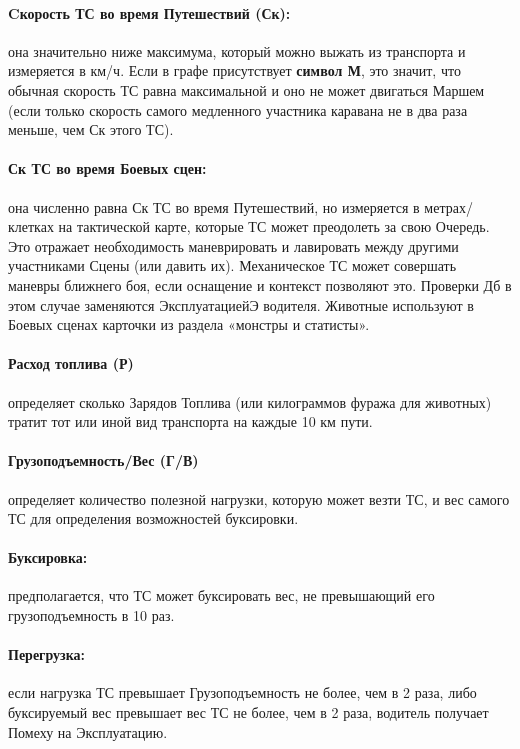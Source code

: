\paragraph{Cкорость ТС во время Путешествий (Ск):} она значительно ниже максимума, который можно выжать из транспорта и измеряется в км/ч. 
\newline Если в графе присутствует \textbf{символ М}, это значит, что обычная скорость ТС равна максимальной и оно не может двигаться Маршем (если только скорость самого медленного участника каравана не в два раза меньше, чем Ск этого ТС).
\paragraph{Ск ТС во время Боевых сцен:} она численно равна Ск ТС во время Путешествий, но измеряется в метрах/клетках на тактической карте, которые ТС может преодолеть за свою Очередь. Это отражает необходимость маневрировать и лавировать между другими участниками Сцены (или давить их). Механическое ТС может совершать маневры ближнего боя, если оснащение и контекст позволяют это. Проверки Дб в этом случае заменяются ЭксплуатациейЭ водителя.
Животные используют в Боевых сценах карточки из раздела «монстры и статисты».
\paragraph{Расход топлива (Р)} определяет сколько Зарядов Топлива (или килограммов фуража для животных) тратит тот или иной вид транспорта на каждые 10 км пути.
\paragraph{Грузоподъемность/Вес (Г/В)} определяет количество полезной нагрузки, которую может везти ТС, и вес самого ТС для определения возможностей буксировки.
\paragraph{Буксировка:} предполагается, что ТС может буксировать вес, не превышающий его грузоподъемность в 10 раз.
\paragraph{Перегрузка:} если нагрузка ТС превышает Грузоподъемность не более, чем в 2 раза, либо буксируемый вес превышает вес ТС не более, чем в 2 раза, водитель получает Помеху на Эксплуатацию.
